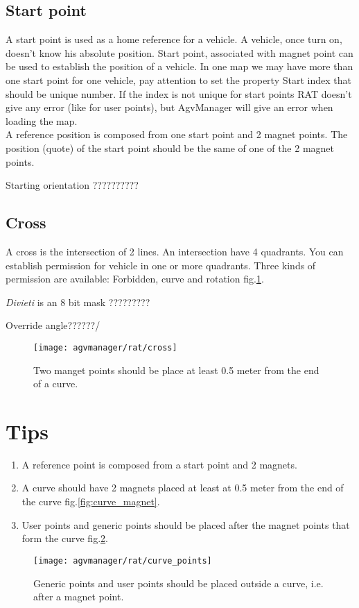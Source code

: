 \subsection{Start point}
A start point is used as a home reference for a vehicle. A vehicle, once turn on, doesn't know his absolute position. Start point, associated with magnet point can be used to establish the position of a vehicle. In one map we may have more than one start point for one vehicle, pay attention to set the property Start index that should be unique number. If the index is not unique for start points RAT doesn't give any error (like for user points), but AgvManager will give an error when loading the map.\\

A reference position is composed from one start point and 2 magnet points. The position (quote) of the start point should be the same of one of the 2 magnet points.

Starting orientation ??????????

\subsection{Cross}
A cross is the intersection of 2 lines. An intersection have 4 quadrants. You can establish permission for vehicle in one or more quadrants. Three kinds of permission are available: Forbidden, curve and rotation fig.\ref{fig:cross}.

\textit{Divieti} is an 8 bit mask ?????????

Override angle??????/


\begin{figure}[h]
	\centering\texttt{[image: agvmanager/rat/cross]}
	\caption{Two manget points should be place at least 0.5 meter from the end of a curve.}
	\label{fig:cross}
\end{figure}

\section{Tips}
\begin{enumerate}
	\item A reference point is composed from a start point and 2 magnets.
	\item A curve should have 2 magnets placed at least at 0.5 meter from the end of the curve fig.\ref{fig:curve_magnet}.
	\item User points and generic points should be placed after the magnet points that form the curve fig.\ref{fig:curve_points}.
\end{enumerate}

\begin{figure}[h]
	\centering\texttt{[image: agvmanager/rat/curve\_points]}
	\caption{Generic points and user points should be placed outside a curve, i.e. after a magnet point.}
	\label{fig:curve_points}
\end{figure}




